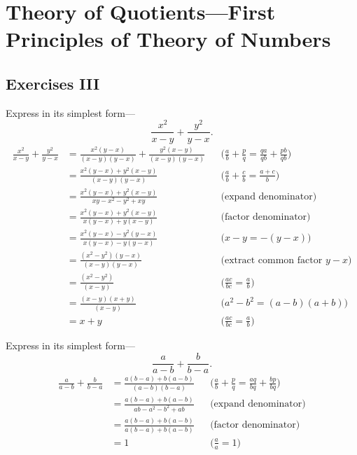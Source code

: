 \documentclass[DIN, pagenumber=false, fontsize=11pt, parskip=half]{scrartcl}
\title{}
\author{} %
\date{}
\begin{document}
\maketitle

\setcounter{section}{2}
\section{Theory of Quotients---First Principles of Theory of Numbers}

\subsection{Exercises III}

\begin{problems}[from=1,step=1]
    \problem Express in its simplest form---
    \[
        \frac{x^2}{x-y} + \frac{y^2}{y-x}.
    \]
    \answer
    \begin{align*}
        \frac{x^2}{x-y} + \frac{y^2}{y-x} &= \frac{x^2(y-x)}{(x-y)(y-x)} + \frac{y^2(x-y)}{(x-y)(y-x)} && \text{($\frac{a}{b} + \frac{p}{q} = \frac{qa}{qb} + \frac{pb}{qb}$)}\\ 
                                          &= \frac{x^2(y-x) + y^2(x-y)}{(x-y)(y-x)} && \text{($\frac{a}{b} + \frac{c}{b} = \frac{a+c}{b}$)}\\ 
                                          &= \frac{x^2(y-x) + y^2(x-y)}{xy-x^2-y^2+xy} && \text{(expand denominator)}\\ 
                                          &= \frac{x^2(y-x) + y^2(x-y)}{x(y-x) + y(x-y)} && \text{(factor denominator)}\\ 
                                          &= \frac{x^2(y-x) - y^2(y-x)}{x(y-x) - y(y-x)} && \text{($x-y = -(y-x)$)}\\ 
                                          &= \frac{(x^2-y^2)(y-x)}{(x-y)(y-x)} && \text{(extract common factor $y-x$)}\\ 
                                          &= \frac{(x^2-y^2)}{(x-y)} && \text{($\frac{ac}{bc} = \frac{a}{b}$)}\\ 
                                          &= \frac{(x-y)(x+y)}{(x-y)} && \text{($a^2-b^2 = (a-b)(a+b)$)}\\ 
                                          &= x+y && \text{($\frac{ac}{bc} = \frac{a}{b}$)}
    \end{align*}

    \problem Express in its simplest form---
    \[
        \frac{a}{a-b} + \frac{b}{b-a}.
    \]
    \answer 
    \begin{align*}
        \frac{a}{a-b} + \frac{b}{b-a} &= \frac{a(b-a) + b(a-b)}{(a-b)(b-a)} && \text{($\frac{a}{b} + \frac{p}{q} = \frac{aq}{bq} + \frac{bp}{bq}$)} \\ 
                                      &= \frac{a(b-a) + b(a-b)}{ab-a^2-b^2+ab} && \text{(expand denominator)}\\ 
                                      &= \frac{a(b-a) + b(a-b)}{a(b-a) + b(a-b)} && \text{(factor denominator)} \\ 
                                      &= 1 && \text{($\frac{a}{a} = 1$)}
    \end{align*}



\end{problems}
\end{document}

